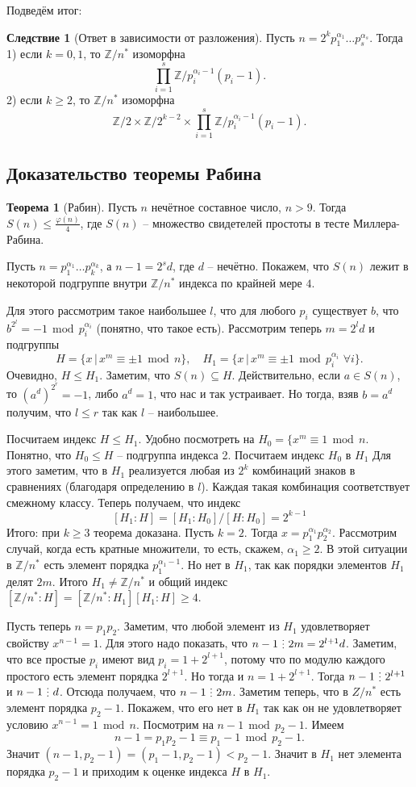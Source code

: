 \documentclass[10pt,a4paper,oneside]{book}
\theoremstyle{definition}
\newtheorem{thm}{\color{red!40!black}Теорема}
\newtheorem{cor}{\color{green!45!black}Следствие}
\renewcommand{\leq}{\leqslant}
\renewcommand{\geq}{\geqslant}
\renewcommand{\mod}{\,\operatorname{mod}\,}
\newcommand{\mb}[1]{\mathbb{#1}}
\newcommand{\di}{\mathop{\,\scalebox{0.85}{\raisebox{-1.2pt}[0.5\height]{\vdots}}\,}}
\def\thrm{\begin{thm}}
\def\ethrm{\end{thm}}
\def\crl{\begin{cor}}
\def\ecrl{\end{cor}}
\begin{document}
\endproof

Подведём итог: 

\crl[Ответ в зависимости от разложения] Пусть $n=2^kp_1^{\alpha_1}\dots p_s^{\alpha_s}$. Тогда\\
1) если $k = 0,1$, то  $\mb Z/n^*$ изоморфна $$\prod_{i=1}^s \mb Z/p_i^{\alpha_i-1}(p_i -1).$$
2) если $ k\geq 2$, то $\mb Z/n^*$ изоморфна $$\mb Z/2 \times \mb Z/2^{k-2} \times \prod_{i=1}^s \mb Z/p_i^{\alpha_i-1}(p_i -1).$$
\ecrl

\subsection{Доказательство теоремы Рабина}

\thrm[Рабин] Пусть $n$ нечётное составное число,  $n>9$. Тогда $S(n)\leq \frac{\varphi(n)}{4}$, где $S(n)$ -- множество свидетелей простоты в тесте Миллера-Рабина.
\ethrm
\proof Пусть $n=p_1^{\alpha_1}\dots p_k^{\alpha_k}$, а $n-1=2^sd$, где $d$ -- нечётно. Покажем, что $S(n)$ лежит в некоторой подгруппе внутри $\mb Z/n^*$ индекса по крайней мере $4$.

Для этого рассмотрим  такое наибольшее $l$, что для любого $p_i$ существует $b$, что $b^{2^l}=-1 \mod p_i^{\alpha_i}$ (понятно, что такое есть). Рассмотрим теперь $m=2^ld$ и подгруппы $$H=\{ x\,|\, x^m\equiv \pm 1 \mod n\}, \quad H_1=\{ x\,|\, x^m \equiv \pm 1 \mod p_i^{\alpha_i} \,\,\forall i\}.$$
Очевидно, $H \leq H_1$. Заметим, что $S(n) \subseteq H$. Действительно, если $a\in S(n)$, то $(a^d)^{2^r}= -1$, либо $a^d=1$, что нас и так устраивает.  Но тогда, взяв $b=a^d$ получим, что $l\leq r$ так как $l$ -- наибольшее.

Посчитаем индекс $H \leq H_1$. Удобно посмотреть на $H_0= \{ x^m \equiv 1 \mod n$. Понятно, что $H_0 \leq H$ -- подгруппа индекса 2. Посчитаем индекс $H_0$ в $H_1$ Для этого заметим, что в $H_1$ реализуется любая из $2^k$ комбинаций знаков в сравнениях (благодаря определению в $l$). Каждая такая комбинация соответствует смежному классу. Теперь получаем, что индекс $$[H_1:H]=[H_1:H_0]/[H:H_0]=2^{k-1}$$
Итого: при $k\geq 3$ теорема доказана. Пусть $k=2$. Тогда $x=p_1^{\alpha_1}p_2^{\alpha_2}$. Рассмотрим случай, когда есть кратные множители, то есть, скажем, $\alpha_1\geq 2$. В этой ситуации в $\mb Z/n^*$ есть элемент порядка $p_1^{\alpha_1-1}$. Но нет в $H_1$, так как порядки элементов $H_1$ делят $2m$. Итого $H_1 \neq \mb Z/n^*$ и общий индекс $[\mb Z/n^*: H]=[\mb Z/n^*:H_1][H_1:H]\geq 4$.

Пусть теперь $n=p_1p_2$. Заметим, что любой элемент из $H_1$ удовлетворяет свойству $x^{n-1}=1$. Для этого надо показать, что $n-1 \di 2m=2^{l+1}d$. Заметим, что все простые $p_i$ имеют вид $p_i=1+2^{l+1}$, потому что по модулю каждого простого есть элемент порядка $2^{l+1}$. Но тогда и $n=1+2^{l+1}$. Тогда $n-1\di 2^{l+1}$ и $n-1\di d$. Отсюда получаем, что $n-1 \di 2m$. Заметим теперь, что в $Z/n^*$ есть элемент порядка $p_2-1$. Покажем, что его нет в $H_1$ так как он не удовлетворяет условию $x^{n-1}=1 \mod n$. Посмотрим на $n-1 \mod p_2-1$. Имеем $$n-1=p_1p_2-1\equiv p_1-1 \mod p_2-1.$$
Значит $(n-1,p_2-1)=(p_1-1,p_2-1)<p_2-1$. Значит в $H_1$ нет элемента порядка $p_2-1$ и приходим к оценке индекса $H$ в $H_1$.
\end{document}
